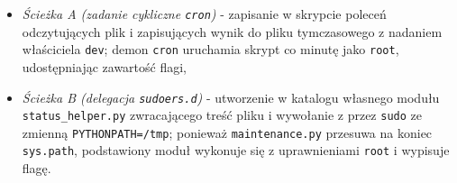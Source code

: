 \begin{enumerate}
    \begin{itemize}
        \item \emph{Ścieżka A (zadanie cykliczne \texttt{cron})} - zapisanie w skrypcie  poleceń odczytujących plik  i zapisujących wynik do pliku tymczasowego z nadaniem właściciela \texttt{dev}; demon \texttt{cron} uruchamia skrypt co minutę jako \texttt{root}, udostępniając zawartość flagi,
        \item \emph{Ścieżka B (delegacja \texttt{sudoers.d})} - utworzenie w katalogu  własnego modułu \texttt{status\_helper.py} zwracającego treść pliku  i wywołanie  z  przez \texttt{sudo} ze zmienną \texttt{PYTHONPATH=/tmp}; ponieważ \texttt{maintenance.py} przesuwa  na koniec \texttt{sys.path}, podstawiony moduł wykonuje się z uprawnieniami \texttt{root} i wypisuje flagę.
    \end{itemize}
\end{enumerate}
